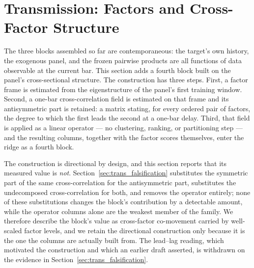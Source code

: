 \section{Transmission: Factors and Cross-Factor Structure}
\label{sec:transmission}


The three blocks assembled so far are contemporaneous: the target's own
history, the exogenous panel, and the frozen pairwise products are all
functions of data observable at the current bar. This section adds a fourth
block built on the panel's cross-sectional structure. The construction has
three steps. First, a factor frame is estimated from the eigenstructure of
the panel's first training window. Second, a one-bar cross-correlation
field is estimated on that frame and its antisymmetric part is retained:
a matrix stating, for every ordered pair of factors, the degree to which
the first leads the second at a one-bar delay. Third, that field is
applied as a linear operator --- no clustering, ranking, or partitioning
step --- and the resulting columns, together with the factor scores
themselves, enter the ridge as a fourth block.

The construction is directional by design, and this section reports that
its measured value is \emph{not}. Section~\ref{sec:trans_falsification}
substitutes the symmetric part of the same cross-correlation for the
antisymmetric part, substitutes the undecomposed cross-correlation for
both, and removes the operator entirely; none of these substitutions
changes the block's contribution by a detectable amount, while the
operator columns alone are the weakest member of the family. We therefore
describe the block's value as cross-factor co-movement carried by
well-scaled factor levels, and we retain the directional construction
only because it is the one the columns are actually built from. The
lead--lag reading, which motivated the construction and which an earlier
draft asserted, is withdrawn on the evidence in
Section~\ref{sec:trans_falsification}.

